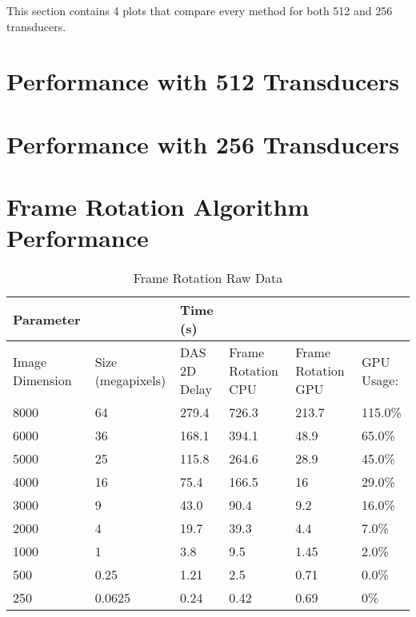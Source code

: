\label{app:supp_plots}
\graphicspath{{C:/Users/cason/OneDrive/Documents/PSU/Project/02_MATLAB/05_DataOut/}}

This section contains 4 plots that compare every method for both 512 and 256 transducers.

\section{Performance with 512 Transducers}
\label{appA:512_transducerfigs}

\section{Performance with 256 Transducers}
\label{appA:256_transducerfigs}

\section{Frame Rotation Algorithm Performance}
\label{appA:rotation_data}
\begin{table}[!ht]
    \caption{Frame Rotation Raw Data}
    \centering
    \begin{tabular}{|p{0.75in}|p{1in}|p{1in}|p{1in}|p{1in}|p{0.6in}|}
    \hline
        Parameter & ~ & Time (s) & ~ & ~ & ~ \\ \hline
        Image Dimension & Size (megapixels) & DAS 2D Delay & Frame Rotation CPU & Frame Rotation GPU & GPU Usage:\\ \hline
        8000 & 64 & 279.4 & 726.3 & 213.7 & 115.0\% \\ \hline
        6000 & 36 & 168.1 & 394.1 & 48.9 & 65.0\% \\ \hline
        5000 & 25 & 115.8 & 264.6 & 28.9 & 45.0\% \\ \hline
        4000 & 16 & 75.4 & 166.5 & 16 & 29.0\% \\ \hline
        3000 & 9 & 43.0 & 90.4 & 9.2 & 16.0\% \\ \hline
        2000 & 4 & 19.7 & 39.3 & 4.4 & 7.0\%  \\ \hline
        1000 & 1 & 3.8 & 9.5 & 1.45 & 2.0\% \\ \hline
        500 & 0.25 & 1.21 & 2.5 & 0.71 & 0.0\% \\ \hline
        250 & 0.0625 & 0.24 & 0.42 & 0.69 & 0\% \\ \hline
    \end{tabular}
\end{table}